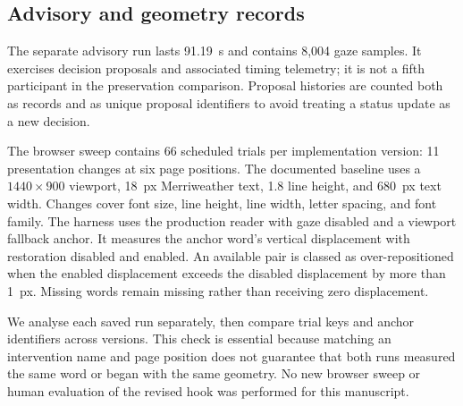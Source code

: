 \subsection{Advisory and geometry records}

The separate advisory run lasts 91.19~s and contains 8,004 gaze samples. It exercises decision proposals and associated timing telemetry; it is not a fifth participant in the preservation comparison. Proposal histories are counted both as records and as unique proposal identifiers to avoid treating a status update as a new decision.

The browser sweep contains 66 scheduled trials per implementation version: 11 presentation changes at six page positions. The documented baseline uses a $1440\times900$ viewport, 18~px Merriweather text, 1.8 line height, and 680~px text width. Changes cover font size, line height, line width, letter spacing, and font family. The harness uses the production reader with gaze disabled and a viewport fallback anchor. It measures the anchor word's vertical displacement with restoration disabled and enabled. An available pair is classed as over-repositioned when the enabled displacement exceeds the disabled displacement by more than 1~px. Missing words remain missing rather than receiving zero displacement.

We analyse each saved run separately, then compare trial keys and anchor identifiers across versions. This check is essential because matching an intervention name and page position does not guarantee that both runs measured the same word or began with the same geometry. No new browser sweep or human evaluation of the revised hook was performed for this manuscript.
